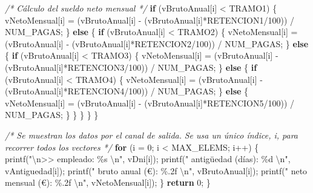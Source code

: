 \documentclass[
]{book}
\newenvironment{Shaded}{\begin{snugshade}}{\end{snugshade}}
\newcommand{\CommentTok}[1]{\textcolor[rgb]{0.56,0.35,0.01}{\textit{#1}}}
\newcommand{\ControlFlowTok}[1]{\textcolor[rgb]{0.13,0.29,0.53}{\textbf{#1}}}
\newcommand{\DecValTok}[1]{\textcolor[rgb]{0.00,0.00,0.81}{#1}}
\newcommand{\NormalTok}[1]{#1}
\newcommand{\SpecialCharTok}[1]{\textcolor[rgb]{0.00,0.00,0.00}{#1}}
\newcommand{\StringTok}[1]{\textcolor[rgb]{0.31,0.60,0.02}{#1}}
\begin{document}
\begin{Shaded}
\begin{Highlighting}[]
        \CommentTok{/* Cálculo del sueldo neto mensual */}
        \ControlFlowTok{if}\NormalTok{ (vBrutoAnual[i] \textless{} TRAMO1) \{}
\NormalTok{            vNetoMensual[i] = (vBrutoAnual[i] {-} (vBrutoAnual[i]*RETENCION1/}\DecValTok{100}\NormalTok{)) / NUM\_PAGAS;}
\NormalTok{        \} }\ControlFlowTok{else}\NormalTok{ \{}
            \ControlFlowTok{if}\NormalTok{ (vBrutoAnual[i] \textless{} TRAMO2) \{}
\NormalTok{                vNetoMensual[i] = (vBrutoAnual[i] {-} (vBrutoAnual[i]*RETENCION2/}\DecValTok{100}\NormalTok{)) / NUM\_PAGAS;}
\NormalTok{            \} }\ControlFlowTok{else}\NormalTok{ \{}
                \ControlFlowTok{if}\NormalTok{ (vBrutoAnual[i] \textless{} TRAMO3) \{}
\NormalTok{                    vNetoMensual[i] = (vBrutoAnual[i] {-} (vBrutoAnual[i]*RETENCION3/}\DecValTok{100}\NormalTok{)) / NUM\_PAGAS;}
\NormalTok{                \} }\ControlFlowTok{else}\NormalTok{ \{}
                    \ControlFlowTok{if}\NormalTok{ (vBrutoAnual[i] \textless{} TRAMO4) \{}
\NormalTok{                        vNetoMensual[i] = (vBrutoAnual[i] {-} (vBrutoAnual[i]*RETENCION4/}\DecValTok{100}\NormalTok{)) / NUM\_PAGAS;}
\NormalTok{                    \} }\ControlFlowTok{else}\NormalTok{ \{}
\NormalTok{                        vNetoMensual[i] = (vBrutoAnual[i] {-} (vBrutoAnual[i]*RETENCION5/}\DecValTok{100}\NormalTok{)) / NUM\_PAGAS;}
\NormalTok{                    \}}
\NormalTok{                \}}
\NormalTok{            \}}
\NormalTok{        \}}
\NormalTok{    \}}
    
    \CommentTok{/* Se muestran los datos por el canal de salida.}
\CommentTok{       Se usa un único índice, \textquotesingle{}i\textquotesingle{}, para recorrer todos los vectores */}
    \ControlFlowTok{for}\NormalTok{ (i = }\DecValTok{0}\NormalTok{; i \textless{} MAX\_ELEMS; i++) \{}
\NormalTok{        printf(}\StringTok{"}\SpecialCharTok{\textbackslash{}n}\StringTok{\textgreater{}\textgreater{} empleado: \%s }\SpecialCharTok{\textbackslash{}n}\StringTok{"}\NormalTok{, vDni[i]);}
\NormalTok{        printf(}\StringTok{"   antigüedad (días): \%d }\SpecialCharTok{\textbackslash{}n}\StringTok{"}\NormalTok{, vAntiguedad[i]);}
\NormalTok{        printf(}\StringTok{"   bruto anual (€): \%.2f }\SpecialCharTok{\textbackslash{}n}\StringTok{"}\NormalTok{, vBrutoAnual[i]);}
\NormalTok{        printf(}\StringTok{"   neto mensual (€): \%.2f }\SpecialCharTok{\textbackslash{}n}\StringTok{"}\NormalTok{, vNetoMensual[i]);}
\NormalTok{    \}}
    \ControlFlowTok{return} \DecValTok{0}\NormalTok{;}
\NormalTok{\}}
\end{Highlighting}
\end{Shaded}
\end{document}
